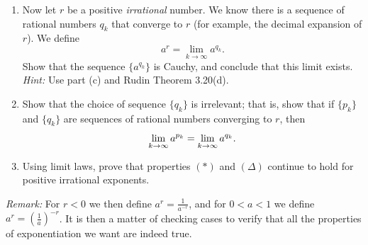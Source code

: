 \documentclass[12pt, letterpaper]{article}
\newcommand{\0}{\mathbf{0}}
\newcommand{\1}{\mathbf{1}}
\begin{document}
\begin{enumerate}
\begin{enumerate}
        \item 
        Now let $r$ be a positive \textit{irrational} number. We know there is a sequence of rational numbers $q_k$ that converge to $r$ (for example, the decimal expansion of $r$). We define
        \begin{equation*}
            a^r = \lim_{k \to \infty} a^{q_k}.
        \end{equation*}
        Show that the sequence $\{a^{q_k}\}$ is Cauchy, and conclude that this limit exists.\\ \textit{Hint:} Use part (c) and Rudin Theorem 3.20(d).\\
        
        \item
        Show that the choice of sequence $\{q_k\}$ is irrelevant; that is, show that if $\{p_k\}$ and $\{q_k\}$ are sequences of rational numbers converging to $r$, then 
        \begin{equation*}
            \lim_{k \to \infty} a^{p_k} = \lim_{k \to \infty} a^{q_k}.\\
        \end{equation*}

        \item 
        Using limit laws, prove that properties $(\ast)$ and $(\Delta)$ continue to hold for positive irrational exponents.\\
        
    \end{enumerate}

    \textit{Remark:} For $r < 0$ we then define $a^r = \frac{1}{a^{-r}}$, and for $0 < a < 1$ we define $a^r = \left(\frac{1}{a}\right)^{-r}$. It is then a matter of checking cases to verify that all the properties of exponentiation we want are indeed true.
    
    
    
\end{enumerate}
\end{document}
